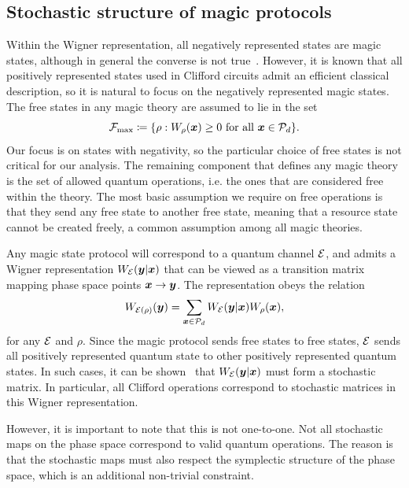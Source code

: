 \documentclass[pra,
aps,
twocolumn,
superscriptaddress,
groupedaddress,
nofootinbib,
reprint
]{revtex4-1}
\begin{document}
\subsection{Stochastic structure of magic protocols}
\label{sec:struc}

Within the Wigner representation, all negatively represented states are magic states, although in general the converse is not true~\cite{cit:campbell}. However, it is known that all positively represented states used in Clifford circuits admit an efficient classical description, so it is natural to focus on the negatively represented magic states. The free states in any magic theory are assumed to lie in the set
\begin{equation}
    \Fmax \coloneqq \{ \rho: \W[\bmx]{\rho} \geq 0 \text{ for all } \bmx \in \cal{P}_d\}.
\end{equation}
Our focus is on states with negativity, so the particular choice of free states is not critical for our analysis. The remaining component that defines any magic theory is the set of allowed quantum operations, i.e. the ones that are considered free within the theory. The most basic assumption we require on free operations is that they send any free state to another free state, meaning that a resource state cannot be created freely, a common assumption among all magic theories.

Any magic state protocol will correspond to a quantum channel ${\mathcal E}$, and admits a Wigner representation $W_{{\mathcal E}}( \boldsymbol{y} | \boldsymbol{x})$ that can be viewed as a transition matrix mapping phase space points $\boldsymbol{x} \rightarrow \boldsymbol{y}$. The representation obeys the relation 
\begin{equation}
	W_{{\mathcal E}(\rho)} (\boldsymbol{y}) = \sum_{\boldsymbol{x} \in {\mathcal P}_d} W_{{\mathcal E}}( \boldsymbol{y} | \boldsymbol{x}) W_\rho(\boldsymbol{x}),
\end{equation}
for any ${\mathcal E}$ and $\rho$. Since the magic protocol sends free states to free states, ${\mathcal E}$ sends all positively represented quantum state to other positively represented quantum states. In such cases, it can be shown~\cite{Wang_2019} that $W_{{\mathcal E}}(\boldsymbol{y} |\boldsymbol{x})$ must form a stochastic matrix. In particular, all Clifford operations correspond to stochastic matrices in this Wigner representation. 

However, it is important to note that this is not one-to-one. Not all stochastic maps on the phase space correspond to valid quantum operations. The reason is that the stochastic maps must also respect the symplectic structure of the phase space, which is an additional non-trivial constraint.
\end{document}
